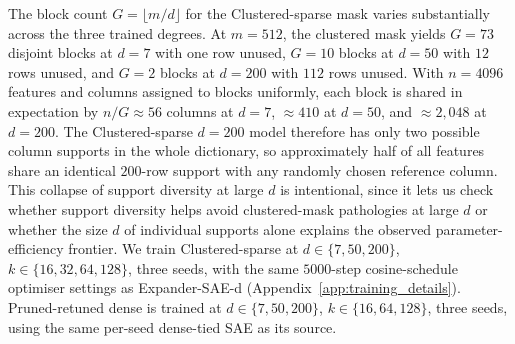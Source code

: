 \documentclass{article}
\theoremstyle{plain}
\theoremstyle{definition}
\theoremstyle{remark}
\begin{document}
The block count $G = \lfloor m/d \rfloor$ for the Clustered-sparse mask varies substantially across the three trained degrees. At $m{=}512$, the clustered mask yields $G{=}73$ disjoint blocks at $d{=}7$ with one row unused, $G{=}10$ blocks at $d{=}50$ with $12$ rows unused, and $G{=}2$ blocks at $d{=}200$ with $112$ rows unused. With $n{=}4096$ features and columns assigned to blocks uniformly, each block is shared in expectation by $n/G \approx 56$ columns at $d{=}7$, $\approx 410$ at $d{=}50$, and $\approx 2{,}048$ at $d{=}200$. The Clustered-sparse $d{=}200$ model therefore has only two possible column supports in the whole dictionary, so approximately half of all features share an identical $200$-row support with any randomly chosen reference column. This collapse of support diversity at large $d$ is intentional, since it lets us check whether support diversity helps avoid clustered-mask pathologies at large $d$ or whether the size $d$ of individual supports alone explains the observed parameter-efficiency frontier. We train Clustered-sparse at $d \in \{7, 50, 200\}$, $k \in \{16, 32, 64, 128\}$, three seeds, with the same $5000$-step cosine-schedule optimiser settings as Expander-SAE-d (Appendix~\ref{app:training_details}). Pruned-retuned dense is trained at $d \in \{7, 50, 200\}$, $k \in \{16, 64, 128\}$, three seeds, using the same per-seed dense-tied SAE as its source.
\end{document}
